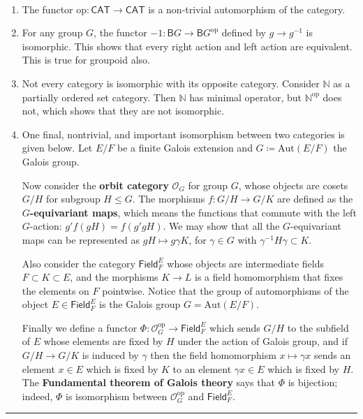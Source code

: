 \begin{exmp}
~\begin{enumerate}
\item The functor $\mathrm{op}:\mathsf{CAT}\rightarrow \mathsf{CAT}$ is a non-trivial automorphism of the category.
\item For any group $G$, the functor $-1:\mathsf{B}G\rightarrow \mathsf{B}G^{\mathrm{op}}$ defined by $g\rightarrow g^{-1}$ is isomorphic. This shows that every right action and left action are equivalent. This is true for groupoid also.
\item Not every category is isomorphic with its opposite category. Consider $\mathbb{N}$ as a partially ordered set category. Then $\mathbb{N}$ has minimal operator, but $\mathbb{N}^{\mathrm{op}}$ does not, which shows that they are not isomorphic.
\item One final, nontrivial, and important isomorphism between two categories is given below. Let $E/F$ be a finite Galois extension and $G\coloneqq \mathrm{Aut}(E/F)$ the Galois group. 

Now consider the \textbf{orbit category} $\mathcal{O}_G$ for group $G$, whose objects are cosets $G/H$ for subgroup $H\leq G$. The morphisms $f:G/H\rightarrow G/K$ are defined as the \textbf{$G$-equivariant maps}, which means the functions that commute with the left $G$-action: $g'f(gH)=f(g'gH)$. We may show that all the $G$-equivariant maps can be represented as $gH\mapsto g\gamma K$, for $\gamma \in G$ with $\gamma^{-1}H\gamma\subset K$.

Also consider the category $\mathsf{Field}_F^E$ whose objects are intermediate fields $F\subset K\subset E$, and the morphisms $K\rightarrow L$ is a field homomorphism that fixes the elements on $F$ pointwise. Notice that the group of automorphisms of the object $E\in \mathsf{Field}_F^E$ is the Galois group $G=\mathrm{Aut}(E/F)$.

Finally we define a functor $\Phi:\mathcal{O}_G^{\mathrm{op}}\rightarrow \mathsf{Field}_F^E$ which sends $G/H$ to the subfield of $E$ whose elements are fixed by $H$ under the action of Galois group, and if $G/H\rightarrow G/K$ is induced by $\gamma$ then the field homomorphism $x\mapsto \gamma x$ sends an element $x\in E$ which is fixed by $K$ to an element $\gamma x\in E$ which is fixed by $H$. The \textbf{Fundamental theorem of Galois theory} says that $\Phi$ is bijection; indeed, $\Phi$ is isomorphism between $\mathcal{O}_G^{\mathrm{op}}$ and $\mathsf{Field}_F^E$.
\end{enumerate}
\end{exmp}

\noindent\rule{\textwidth}{1pt}
\newline